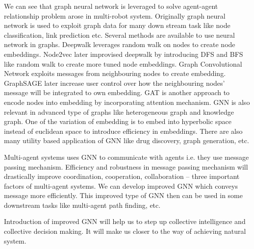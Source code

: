 \documentclass[serif,professionalfont]{article}
\begin{document}
We can see that graph neural network is leveraged to solve agent-agent relationship problem arose in multi-robot system. Originally graph neural network is used to exploit graph data for many down stream task like node classification, link prediction etc. Several methods are available to use neural network in graphs. Deepwalk\cite{deepwalk} leverages random walk on nodes to create node embeddings. Node2vec\cite{node2vec} later improvised deepwalk\cite{deepwalk} by introducing DFS and BFS like random walk to create more tuned node embeddings. Graph Convolutional Network\cite{gcn} exploits messages from neighbouring nodes to create embedding. GraphSAGE\cite{graphsage} later increase user control over how the neighbouring nodes' message will be integrated to own embedding. GAT\cite{gat} is another approach to encode nodes into embedding by incorporating attention mechanism. GNN is also relevant in advanced type of graphs like heterogeneous graph\cite{HeterogeneousMultiRobotReinforcementLearning} and knowledge graph. One of the variation of embedding is to embed into hyperbolic space instead of euclidean space to introduce efficiency in embeddings. There are also many utility based application of GNN like drug discovery, graph generation, etc.

Multi-agent systems uses GNN to communicate with agents i.e. they use message passing mechanism. Efficiency and robustness in message passing mechanism will drastically improve coordination, cooperation, collaboration -- three important factors of multi-agent systems. We can develop improved GNN which conveys message more efficiently. This improved type of GNN then can be used in some downstream tasks like multi-agent path finding, etc.

Introduction of improved GNN will help us to step up collective intelligence and collective decision making. It will make us closer to the way of achieving natural system.
\newpage



\end{document}
